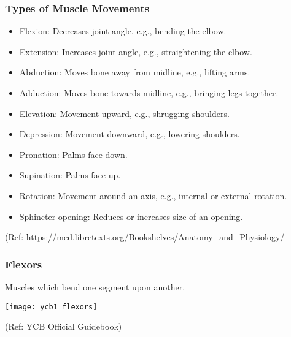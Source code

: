 \begin{frame}[fragile]\frametitle{Types of Muscle Movements}

      \begin{itemize}
		\item Flexion: Decreases joint angle, e.g., bending the elbow.
		\item Extension: Increases joint angle, e.g., straightening the elbow.
		\item Abduction: Moves bone away from midline, e.g., lifting arms.
		\item Adduction: Moves bone towards midline, e.g., bringing legs together.
		\item Elevation: Movement upward, e.g., shrugging shoulders.
		\item Depression: Movement downward, e.g., lowering shoulders.
		\item Pronation: Palms face down.
		\item Supination: Palms face up.
		\item Rotation: Movement around an axis, e.g., internal or external rotation.
		\item Sphincter opening: Reduces or increases size of an opening.
	  \end{itemize}

  
		{\tiny (Ref: https://med.libretexts.org/Bookshelves/Anatomy\_and\_Physiology/}		
  
\end{frame}


				

  
  

\begin{frame}[fragile]\frametitle{Flexors}

 Muscles  which  bend  one  segment 
upon another.

		\begin{center}
		\texttt{[image: ycb1\_flexors]}
				
		\end{center}	

  
		{\tiny (Ref: YCB Official Guidebook)}		
  
\end{frame}


